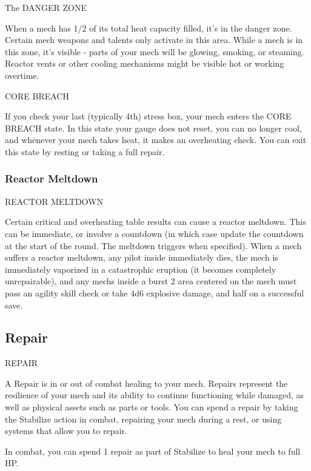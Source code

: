                                             The DANGER ZONE

When a mech has 1/2 of its total heat capacity filled, it’s in the danger zone. Certain mech
weapons and talents only activate in this area. While a mech is in this zone, it’s visible - parts of
your mech will be glowing, smoking, or steaming. Reactor vents or other cooling mechanisms
might be visible hot or working overtime.


                                              CORE BREACH

If you check your last (typically 4th) stress box, your mech enters the CORE BREACH state. In
this state your gauge does not reset, you can no longer cool, and whenever your mech takes
heat, it makes an overheating check. You can exit this state by resting or taking a full repair.

\subsubsection{Reactor Meltdown}

                                      REACTOR MELTDOWN

Certain critical and overheating table results can cause a reactor meltdown. This can be
immediate, or involve a countdown (in which case update the countdown at the start of the
round. The meltdown triggers when specified). When a mech suffers a reactor meltdown, any
pilot inside immediately dies, the mech is immediately vaporized in a catastrophic eruption (it
becomes completely unrepairable), and any mechs inside a burst 2 area centered on the mech
must pass an agility skill check or take 4d6 explosive damage, and half on a successful save.


\subsection{Repair}

                                               REPAIR

A Repair is in or out of combat healing to your mech. Repairs represent the resilience of your
mech and its ability to continue functioning while damaged, as well as physical assets such as
parts or tools. You can spend a repair by taking the Stabilize action in combat, repairing your
mech during a rest, or using systems that allow you to repair.


In combat, you can spend 1 repair as part of Stabilize to heal your mech to full HP.


